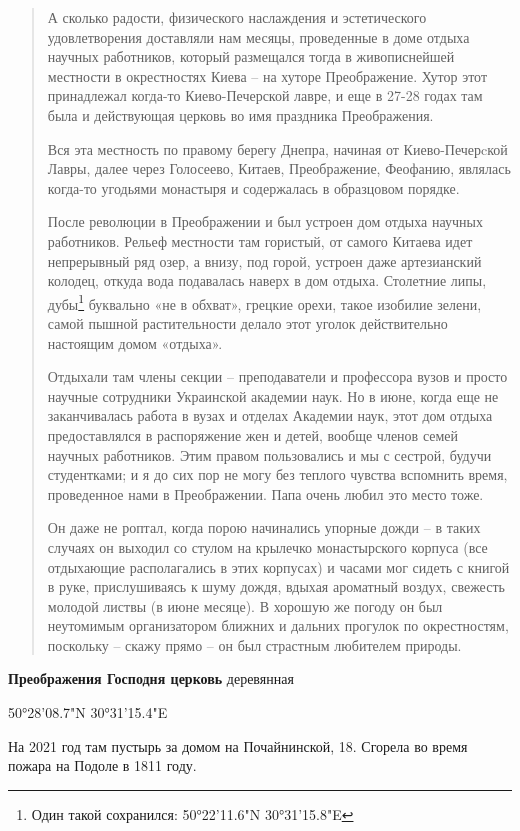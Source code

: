 \begin{quotation}
А сколько радости, физического наслаждения и эстетического удовлетворения доставляли нам месяцы, проведенные в доме отдыха научных работников, который размещался тогда в живописнейшей местности в окрестностях Киева – на хуторе Преображение. Хутор этот принадлежал когда-то Киево-Печерской лавре, и еще в 27-28 годах там была и действующая церковь во имя праздника Преображения.

Вся эта местность по правому берегу Днепра, начиная от Киево-Печер­cкой Лавры, далее через Голосеево, Китаев, Преображение, Феофанию, являлась когда-то угодьями монастыря и содержалась в образцовом порядке. 

После революции в Преображении и был устроен дом отдыха научных работников. Рельеф местности там гористый, от самого Китаева идет непрерывный ряд озер, а внизу, под горой, устроен даже артезианский колодец, откуда вода подавалась наверх в дом отдыха. Столетние липы, дубы\footnote{Один такой сохранился: 50°22'11.6"N 30°31'15.8"E} буквально «не в обхват», грецкие орехи, такое изобилие зелени, самой пышной растительности делало этот уголок действительно настоящим домом «отдыха».

Отдыхали там члены секции – преподаватели и профессора вузов и просто научные сотрудники Украинской академии наук. Но в июне, когда еще не заканчивалась работа в вузах и отделах Академии наук, этот дом отдыха предоставлялся в распоряжение жен и детей, вообще членов семей научных работников. Этим правом пользовались и мы с сестрой, будучи студентками; и я до сих пор не могу без теплого чувства вспомнить время, проведенное нами в Преображении. Папа очень любил это место тоже. 

Он даже не роптал, когда порою начинались упорные дожди – в таких случаях он выходил со стулом на крылечко монастырского корпуса (все отдыхающие располагались в этих корпусах) и часами мог сидеть с книгой в руке, прислушиваясь к шуму дождя, вдыхая ароматный воздух, свежесть молодой листвы (в июне месяце). В хорошую же погоду он был
неутомимым организатором ближних и дальних прогулок по окрестностям, поскольку – скажу прямо – он был страстным любителем природы.
\end{quotation}

 \medskip


\textbf{Преображения Господня церковь} деревянная

50°28'08.7"N 30°31'15.4"E

На 2021 год там пустырь за домом на Почайнинской, 18. Сгорела во время пожара на Подоле в 1811 году.\\ 

